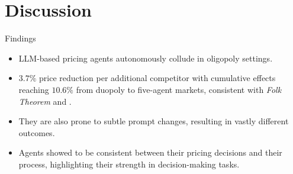 \documentclass[10pt, aspectratio=169]{beamer}
\begin{document}
\section{Discussion}

\begin{frame}{Findings}
    \begin{itemize}
        \item LLM-based pricing agents autonomously collude in oligopoly settings.
        \item $3.7\%$ price reduction per additional competitor with cumulative effects reaching $10.6\%$ from duopoly to five-agent markets, consistent with \textit{Folk Theorem} and \textcite{calvano_artificial_2020}. 
        \item They are also prone to subtle prompt changes, resulting in vastly different outcomes.
        \item Agents showed to be consistent between their pricing decisions and their  process, highlighting their strength in decision-making tasks.
    \end{itemize}
\end{frame}
\end{document}
